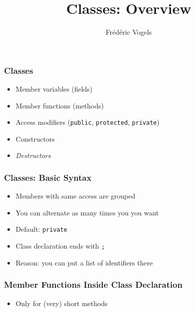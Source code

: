 \documentclass{../ucll-slides}
\title{Classes: Overview}
\author{Fr\'ed\'eric Vogels}
\newcommand{\highlightbox}[2][]{
  \draw[opacity=.75,ultra thick,red,#1] ($ (#2.south west) + (-.1,-.1) $) rectangle ($ (#2.north east) + (.1,.1) $)
}
\begin{document}
\begin{frame}
  \titlepage
\end{frame}

\begin{frame}
  \frametitle{Classes}
  \begin{itemize}
    \item Member variables (fields)
    \item Member functions (methods)
    \item Access modifiers ({\tt public}, {\tt protected}, {\tt private})
    \item Constructors
    \item \emph{Destructors}
  \end{itemize}
\end{frame}

\begin{frame}
  \frametitle{Classes: Basic Syntax}
  \begin{overprint}
    \begin{itemize}
      \item Members with same access are grouped
      \item You can alternate as many times you you want
      \item Default: {\tt private}
    \end{itemize}
    \begin{itemize}
      \item Class declaration ends with {\tt ;}
      \item Reason: you can put a list of identifiers there
    \end{itemize}
  \end{overprint}
\end{frame}

\begin{frame}
  \frametitle{Member Functions Inside Class Declaration}
  \begin{itemize}
    \item Only for (very) short methods
  \end{itemize}
\end{frame}
\end{document}
